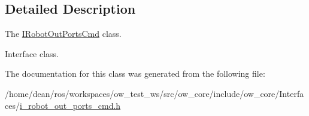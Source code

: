 \subsection{Detailed Description}
The \hyperlink{classow__core_1_1IRobotOutPortsCmd}{I\+Robot\+Out\+Ports\+Cmd} class. 

Interface class. 

The documentation for this class was generated from the following file\+:\begin{DoxyCompactItemize}
\item 
/home/dean/ros/workspaces/ow\+\_\+test\+\_\+ws/src/ow\+\_\+core/include/ow\+\_\+core/\+Interfaces/\hyperlink{i__robot__out__ports__cmd_8h}{i\+\_\+robot\+\_\+out\+\_\+ports\+\_\+cmd.\+h}\end{DoxyCompactItemize}
